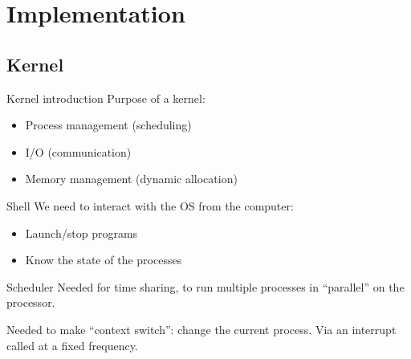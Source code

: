 \documentclass{beamer}
\begin{document}
  \section{Implementation}

    \subsection{Kernel}
      \begin{frame}{Kernel introduction}
        Purpose of a kernel:
        \begin{itemize}
          \item Process management (scheduling)
          \item I/O (communication)
          \item Memory management (dynamic allocation)
        \end{itemize}
      \end{frame}

      \begin{frame}{Shell}
          We need to interact with the OS from the computer:
          \begin{itemize}
            \item Launch/stop programs
            \item Know the state of the processes
          \end{itemize}
      \end{frame}

      \begin{frame}{Scheduler}
        Needed for time sharing, to run multiple processes in ``parallel'' on
        the processor.

        \begin{figure}
            \centering
        \end{figure}

        Needed to make ``context switch'': change the current process. Via an interrupt called at a fixed frequency.
      \end{frame}
\end{document}
